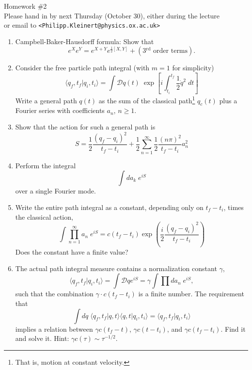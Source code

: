 \documentclass[12pt]{article}
\begin{document}
\begin{center}
  {\Huge Homework \#2}
  \\[1pt]
  Please hand in by next Thursday (October 30), either during the
  lecture
  \\ 
  or email to \texttt{<Philipp.Kleinert@physics.ox.ac.uk>}
\end{center}
\vspace{1cm}


\begin{enumerate}
\item Campbell-Baker-Hausdorff formula: Show that 
  \begin{equation}
    e^X e^Y = e^{X+Y}
    e^{\frac{1}{2}[X,Y]} + 
    (\text{3${}^\text{rd}$ order terms}).
  \end{equation}
\item Consider the free particle path integral (with $m=1$ for
  simplicity)
  \begin{equation}
    \langle q_f, t_f|q_i, t_i\rangle = 
    \int \mathcal{D}q(t) \;
    \exp\left[
      i \int_{t_i}^{t_f} \frac{1}{2} \dot{q}^2 \; dt
    \right]
  \end{equation}
  Write a general path $q(t)$ as the sum of the classical
  path\footnote{That is, motion at constant velocity.}  $q_c(t)$ plus
  a Fourier series with coefficients $a_n$, $n\geq 1$.
\item Show that the action for such a general path is
  \begin{equation}
    S = \frac{1}{2} \frac{(q_f-q_i)^2}{t_f-t_i}
    + \frac{1}{2}
    \sum_{n=1}^\infty \frac{1}{2}
    \frac{(n \pi)^2}{t_f-t_i} a_n^2
  \end{equation}
\item Perform the integral 
  \begin{equation}
    \int da_k \; e^{iS}
  \end{equation}
  over a single Fourier mode.
\item Write the entire path integral as a constant, depending only on
  $t_f-t_i$, times the classical action,
  \begin{equation}
    \int \prod_{n=1}^\infty a_n \; e^{iS}
    = 
    c(t_f-t_i)
    \exp\left(
      \frac{i}{2} \frac{(q_f-q_i)^2}{t_f-t_i}
    \right)
  \end{equation}
  Does the constant have a finite value?
\item The actual path integral measure contains a normalization
  constant $\gamma$, 
  \begin{equation}
    \langle q_f, t_f|q_i, t_i\rangle = 
    \int \mathcal{D}q e^{iS}= 
    \gamma \int \prod da_n \; e^{iS},
  \end{equation}
  such that the combination $\gamma \cdot c(t_f-t_i)$ is a finite
  number. The requirement that 
  \begin{equation}
    \int dq \;
    \langle q_f,t_f|q,t\rangle
    \langle q,t|q_i,t_i\rangle
    = 
    \langle q_f,t_f|q_i,t_i\rangle
  \end{equation}
  implies a relation between $\gamma c(t_f-t)$, $\gamma c(t-t_i)$, and
  $\gamma c(t_f-t_i)$. Find it and solve it. Hint: $\gamma c(\tau) \sim
  \tau^{-1/2}$.
\end{enumerate}
\end{document}
